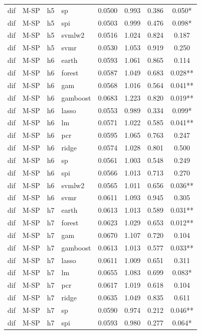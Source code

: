 \begin{ThreePartTable}
\begin{longtable}[t]{llclcccc}
dif & M-SP & h5 & sp & 0.0500 & 0.993 & 0.386 & 0.050*\\
dif & M-SP & h5 & spi & 0.0503 & 0.999 & 0.476 & 0.098*\\
dif & M-SP & h5 & svmlw2 & 0.0516 & 1.024 & 0.824 & 0.187\\
dif & M-SP & h5 & svmr & 0.0530 & 1.053 & 0.919 & 0.250\\
\addlinespace
dif & M-SP & h6 & earth & 0.0593 & 1.061 & 0.865 & 0.114\\
dif & M-SP & h6 & forest & 0.0587 & 1.049 & 0.683 & 0.028**\\
dif & M-SP & h6 & gam & 0.0568 & 1.016 & 0.564 & 0.041**\\
dif & M-SP & h6 & gamboost & 0.0683 & 1.223 & 0.820 & 0.019**\\
dif & M-SP & h6 & lasso & 0.0553 & 0.989 & 0.334 & 0.099*\\
dif & M-SP & h6 & lm & 0.0571 & 1.022 & 0.585 & 0.041**\\
dif & M-SP & h6 & pcr & 0.0595 & 1.065 & 0.763 & 0.247\\
dif & M-SP & h6 & ridge & 0.0574 & 1.028 & 0.801 & 0.500\\
dif & M-SP & h6 & sp & 0.0561 & 1.003 & 0.548 & 0.249\\
dif & M-SP & h6 & spi & 0.0566 & 1.013 & 0.713 & 0.270\\
dif & M-SP & h6 & svmlw2 & 0.0565 & 1.011 & 0.656 & 0.036**\\
dif & M-SP & h6 & svmr & 0.0611 & 1.093 & 0.945 & 0.305\\
\addlinespace
dif & M-SP & h7 & earth & 0.0613 & 1.013 & 0.589 & 0.031**\\
dif & M-SP & h7 & forest & 0.0623 & 1.029 & 0.653 & 0.012**\\
dif & M-SP & h7 & gam & 0.0670 & 1.107 & 0.720 & 0.104\\
dif & M-SP & h7 & gamboost & 0.0613 & 1.013 & 0.577 & 0.033**\\
dif & M-SP & h7 & lasso & 0.0611 & 1.009 & 0.651 & 0.311\\
dif & M-SP & h7 & lm & 0.0655 & 1.083 & 0.699 & 0.083*\\
dif & M-SP & h7 & pcr & 0.0617 & 1.019 & 0.618 & 0.104\\
dif & M-SP & h7 & ridge & 0.0635 & 1.049 & 0.835 & 0.611\\
dif & M-SP & h7 & sp & 0.0590 & 0.974 & 0.212 & 0.046**\\
dif & M-SP & h7 & spi & 0.0593 & 0.980 & 0.277 & 0.064*\\

\end{longtable}
\end{ThreePartTable}
